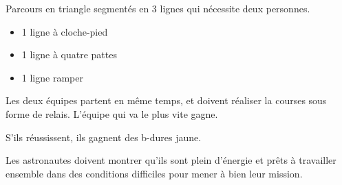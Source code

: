 \documentclass{grand-jeu}
\begin{document}
\begin{liste-materiel}
\end{liste-materiel}

\begin{regles}
Parcours en triangle segmentés en 3 lignes qui nécessite deux personnes.
 
\begin{itemize}
  \item 1 ligne à cloche-pied
  \item 1 ligne à quatre pattes
  \item 1 ligne ramper
\end{itemize}

Les deux équipes partent en même temps, et doivent réaliser la courses sous forme de relais. L’équipe qui va le plus vite gagne.

S’ils réussissent, ils gagnent des b-dures jaune.
\end{regles}

\begin{imaginaire}
Les astronautes doivent montrer qu'ils sont plein d'énergie et prêts à travailler ensemble dans des conditions difficiles pour mener à bien leur mission. 
\end{imaginaire}

\begin{moments-stop}
\end{moments-stop}
\end{document}
